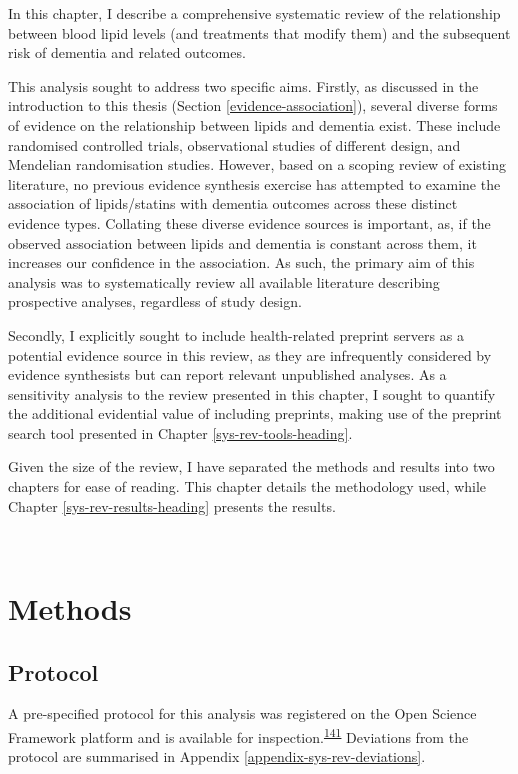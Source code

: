\documentclass[a4paper, twoside]{templates/ociamthesis}
\begin{document}
In this chapter, I describe a comprehensive systematic review of the relationship between blood lipid levels (and treatments that modify them) and the subsequent risk of dementia and related outcomes.

This analysis sought to address two specific aims. Firstly, as discussed in the introduction to this thesis (Section \ref{evidence-association}), several diverse forms of evidence on the relationship between lipids and dementia exist. These include randomised controlled trials, observational studies of different design, and Mendelian randomisation studies. However, based on a scoping review of existing literature, no previous evidence synthesis exercise has attempted to examine the association of lipids/statins with dementia outcomes across these distinct evidence types. Collating these diverse evidence sources is important, as, if the observed association between lipids and dementia is constant across them, it increases our confidence in the association. As such, the primary aim of this analysis was to systematically review all available literature describing prospective analyses, regardless of study design.

Secondly, I explicitly sought to include health-related preprint servers as a potential evidence source in this review, as they are infrequently considered by evidence synthesists but can report relevant unpublished analyses. As a sensitivity analysis to the review presented in this chapter, I sought to quantify the additional evidential value of including preprints, making use of the preprint search tool presented in Chapter \ref{sys-rev-tools-heading}.

Given the size of the review, I have separated the methods and results into two chapters for ease of reading. This chapter details the methodology used, while Chapter \ref{sys-rev-results-heading} presents the results.

~

\hypertarget{methods}{%
\section{Methods}\label{methods}}

\hypertarget{protocol}{%
\subsection{Protocol}\label{protocol}}

A pre-specified protocol for this analysis was registered on the Open Science Framework platform and is available for inspection.\textsuperscript{\protect\hyperlink{ref-mcguinnessluke2020}{141}} Deviations from the protocol are summarised in Appendix \ref{appendix-sys-rev-deviations}.
\end{document}
